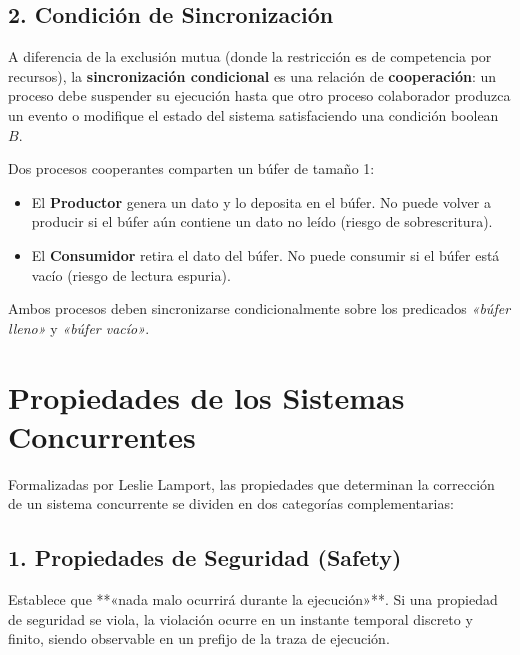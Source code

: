 \subsection{2. Condición de Sincronización}
A diferencia de la exclusión mutua (donde la restricción es de competencia por recursos), la \textbf{sincronización condicional} es una relación de \textbf{cooperación}: un proceso debe suspender su ejecución hasta que otro proceso colaborador produzca un evento o modifique el estado del sistema satisfaciendo una condición boolean $B$.

\begin{ejemplo}
Dos procesos cooperantes comparten un búfer de tamaño 1:
\begin{itemize}
    \item El \textbf{Productor} genera un dato y lo deposita en el búfer. No puede volver a producir si el búfer aún contiene un dato no leído (riesgo de sobrescritura).
    \item El \textbf{Consumidor} retira el dato del búfer. No puede consumir si el búfer está vacío (riesgo de lectura espuria).
\end{itemize}
Ambos procesos deben sincronizarse condicionalmente sobre los predicados \textit{«búfer lleno»} y \textit{«búfer vacío»}.
\end{ejemplo}

\section{Propiedades de los Sistemas Concurrentes}

Formalizadas por Leslie Lamport, las propiedades que determinan la corrección de un sistema concurrente se dividen en dos categorías complementarias:

\subsection{1. Propiedades de Seguridad (Safety)}
\begin{definicion}
Establece que **«nada malo ocurrirá durante la ejecución»**. Si una propiedad de seguridad se viola, la violación ocurre en un instante temporal discreto y finito, siendo observable en un prefijo de la traza de ejecución.
\end{definicion}

